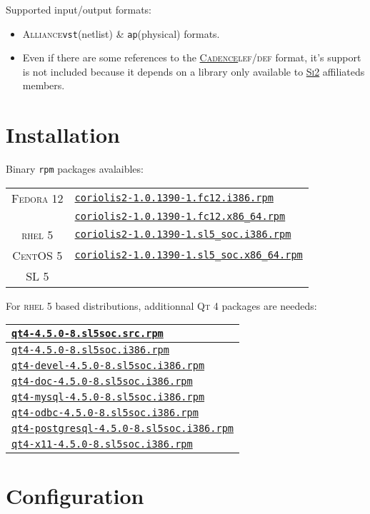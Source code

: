 \documentclass[11pt]{article}
\newcommand {\SiII}               {\href{http://www.si2.org/}{\textsc{Si2}}\xspace}
\newcommand {\Cadence}            {\href{http://www.cadence.com/}{\textsc{Cadence}}\xspace}
\newcommand {\LEFDEF}             {\textsc{lef/def}\xspace}
\newcommand {\RHELV}              {\textsc{rhel 5}\xspace}
\newcommand {\CentOSV}            {\textsc{CentOS 5}\xspace}
\newcommand {\SLV}                {\textsc{SL 5}\xspace}
\newcommand {\FedoraXII}          {\textsc{Fedora 12}\xspace}
\newcommand {\QtIV}               {\textsc{Qt 4}\xspace}
\newcommand {\rpm}                {\texttt{rpm}\xspace}
\newcommand {\Alliance}           {\textsc{Alliance}\xspace}
\newcommand {\vst}                {\texttt{vst}\xspace}
\newcommand {\ap}                 {\texttt{ap}\xspace}
\newcommand {\coriolisIIfcXIIirpm}%
     {\href{ftp://asim.lip6.fr/pub/coriolis/2.0/coriolis2-1.0.1390-1.fc12.i386.rpm}%
      {\texttt{coriolis2-1.0.1390-1.fc12.i386.rpm}\xspace}}
\newcommand {\coriolisIIfcXIIxrpm}%
     {\href{ftp://asim.lip6.fr/pub/coriolis/2.0/coriolis2-1.0.1390-1.fc12.x86\_64.rpm}%
      {\texttt{coriolis2-1.0.1390-1.fc12.x86\_64.rpm}\xspace}}
\newcommand {\coriolisIIslVirpm}%
     {\href{ftp://asim.lip6.fr/pub/coriolis/2.0/coriolis2-1.0.1390-1.sl5\_soc.i386.rpm}%
      {\texttt{coriolis2-1.0.1390-1.sl5\_soc.i386.rpm}\xspace}}
\newcommand {\coriolisIIslVxrpm}%
     {\href{ftp://asim.lip6.fr/pub/coriolis/2.0/coriolis2-1.0.1390-1.sl5\_soc.x86\_64.rpm}%
      {\texttt{coriolis2-1.0.1390-1.sl5\_soc.x86\_64.rpm}\xspace}}
\newcommand {\qtIVsrpm}%
     {\href{http://ftp.lip6.fr/pub/linux/distributions/slsoc/5x/SLSoC/SRPMS/SL/qt4-4.5.0-8.sl5soc.src.rpm}%
      {\texttt{qt4-4.5.0-8.sl5soc.src.rpm}\xspace}}
\newcommand {\qtIVirpm}%
     {\href{http://ftp.lip6.fr/pub/linux/distributions/slsoc/5x/i386/i386/SL/qt4-4.5.0-8.sl5soc.i386.rpm}%
      {\texttt{qt4-4.5.0-8.sl5soc.i386.rpm}\xspace}}
\newcommand {\qtIVdevelirpm}%
     {\href{http://ftp.lip6.fr/pub/linux/distributions/slsoc/5x/i386/i386/SL/qt4-devel-4.5.0-8.sl5soc.i386.rpm}%
      {\texttt{qt4-devel-4.5.0-8.sl5soc.i386.rpm}\xspace}}
\newcommand {\qtIVdocirpm}%
     {\href{http://ftp.lip6.fr/pub/linux/distributions/slsoc/5x/i386/i386/SL/qt4-doc-4.5.0-8.sl5soc.i386.rpm}%
      {\texttt{qt4-doc-4.5.0-8.sl5soc.i386.rpm}\xspace}}
\newcommand {\qtIVmysqlirpm}%
     {\href{http://ftp.lip6.fr/pub/linux/distributions/slsoc/5x/i386/i386/SL/qt4-mysql-4.5.0-8.sl5soc.i386.rpm}%
      {\texttt{qt4-mysql-4.5.0-8.sl5soc.i386.rpm}\xspace}}
\newcommand {\qtIVodbcirpm}%
     {\href{http://ftp.lip6.fr/pub/linux/distributions/slsoc/5x/i386/i386/SL/qt4-odbc-4.5.0-8.sl5soc.i386.rpm}%
      {\texttt{qt4-odbc-4.5.0-8.sl5soc.i386.rpm}\xspace}}
\newcommand {\qtIVpostgresqlirpm}%
     {\href{http://ftp.lip6.fr/pub/linux/distributions/slsoc/5x/i386/i386/SL/qt4-postgresql-4.5.0-8.sl5soc.i386.rpm}%
      {\texttt{qt4-postgresql-4.5.0-8.sl5soc.i386.rpm}\xspace}}
\newcommand {\qtIVxXIirpm}%
     {\href{http://ftp.lip6.fr/pub/linux/distributions/slsoc/5x/i386/i386/SL/qt4-x11-4.5.0-8.sl5soc.i386.rpm}%
      {\texttt{qt4-x11-4.5.0-8.sl5soc.i386.rpm}\xspace}}
\begin{document}
 \noindent Supported input/output formats:
 \begin{itemize}
   \item \Alliance \vst (netlist) \& \ap (physical) formats.
   \item Even if there are some references to the \Cadence \LEFDEF format, it's
         support is not included because it depends on a library only available
         to \SiII affiliateds members.
 \end{itemize}


 \section{Installation}

 Binary \rpm packages avalaibles:
 \begin{center}
 \begin{tabular}{|c|l|}
   \hline
   \FedoraXII & \coriolisIIfcXIIirpm  \\
              & \coriolisIIfcXIIxrpm  \\
   \hline
   \RHELV     & \coriolisIIslVirpm  \\
   \CentOSV   & \coriolisIIslVxrpm  \\
   \SLV       &                     \\
   \hline
 \end{tabular}
 \end{center}
 For \RHELV based distributions, additionnal \QtIV packages are neededs:

 \begin{center}
 \begin{tabular}{|l|}
   \hline
   \qtIVsrpm           \\
   \hline
   \hline
   \qtIVirpm           \\
   \qtIVdevelirpm      \\
   \qtIVdocirpm        \\
   \qtIVmysqlirpm      \\
   \qtIVodbcirpm       \\
   \qtIVpostgresqlirpm \\
   \qtIVxXIirpm        \\
   \hline
 \end{tabular}
 \end{center}

 \section{Configuration}
\end{document}
